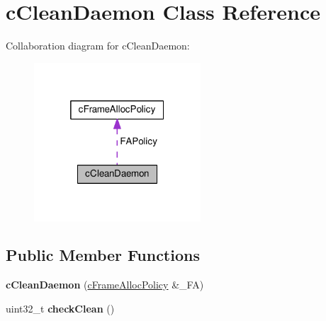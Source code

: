 \hypertarget{classcCleanDaemon}{\section{c\-Clean\-Daemon \-Class \-Reference}
\label{d3/d6f/classcCleanDaemon}
}


\-Collaboration diagram for c\-Clean\-Daemon\-:\nopagebreak
\begin{figure}[H]
\begin{center}
\leavevmode
\includegraphics[width=176pt]{d7/def/classcCleanDaemon__coll__graph}
\end{center}
\end{figure}
\subsection*{\-Public \-Member \-Functions}
\begin{DoxyCompactItemize}
\item 
\hypertarget{classcCleanDaemon_a7646bbaebfefa0c9478e5a23333768db}{{\bfseries c\-Clean\-Daemon} (\hyperlink{classcFrameAllocPolicy}{c\-Frame\-Alloc\-Policy} \&\-\_\-\-F\-A)}\label{d3/d6f/classcCleanDaemon_a7646bbaebfefa0c9478e5a23333768db}

\item 
\hypertarget{classcCleanDaemon_ac9a8ca1ac1d35f554af393274dd87f68}{uint32\-\_\-t {\bfseries check\-Clean} ()}\label{d3/d6f/classcCleanDaemon_ac9a8ca1ac1d35f554af393274dd87f68}

\end{DoxyCompactItemize}
